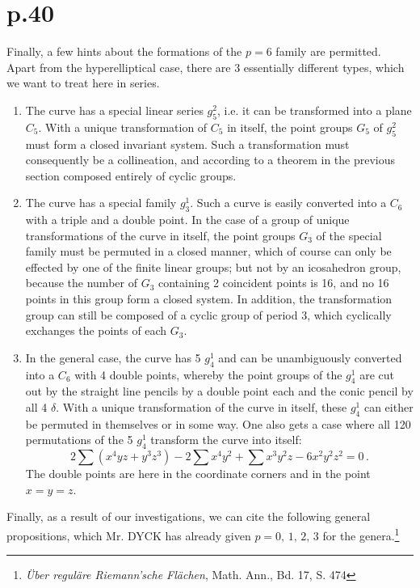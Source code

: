 \documentclass[leqno]{article}
\begin{document}
\section{p.40}
Finally, a few hints about the formations of the $p=6$ family are permitted. Apart from the hyperelliptical case, there are 3 essentially different types, which we want to treat here in series.
\begin{enumerate}[label=\arabic*)]
	\item The curve has a special linear series $g_5^2$, i.e. it can be transformed into a plane $C_5$. With a unique transformation of $C_5$ in itself, the point groups $G_5$ of $g_5^2$ must form a closed invariant system. Such a transformation must consequently be a collineation, and according to a theorem in the previous section composed entirely of cyclic groups.
	\item The curve has a special family $g_3^1$. Such a curve is easily converted into a $C_6$ with a triple and a double point. In the case of a group of unique transformations of the curve in itself, the point groups $G_3$ of the special family must be permuted in a closed manner, which of course can only be effected by one of the finite linear groups; but not by an icosahedron group, because the number of $G_3$ containing 2 coincident points is 16, and no 16 points in this group form a closed system. In addition, the transformation group can still be composed of a cyclic group of period 3, which cyclically exchanges the points of each $G_3$.
	\item In the general case, the curve has 5 $g_4^1$ and can be unambiguously converted into a $C_6$ with 4 double points, whereby the point groups of the $g_4^1$ are cut out by the straight line pencils by a double point each and the conic pencil by all 4 $\delta$. With a unique transformation of the curve in itself, these $g_4^1$ can either be permuted in themselves or in some way. One also gets a case where all 120 permutations of the 5 $g_4^1$ transform the curve into itself: 
	\[
	2 \sum (x^4 y z + y^3 z^3) - 2 \sum x^4 y^2 + \sum x^3 y^2 z - 6 x^2 y^2 z^2 = 0 \, . 
	\]
	The double points are here in the coordinate corners and in the point $x=y=z$.
\end{enumerate}
Finally, as a result of our investigations, we can cite the following general propositions, which Mr. DYCK has already given $p=0, \, 1, \, 2, \, 3$ for the genera.\footnote{\textit{\"Uber regul\"are Riemann'sche Fl\"achen}, Math. Ann., Bd. 17, S. 474} \\
\end{document}
